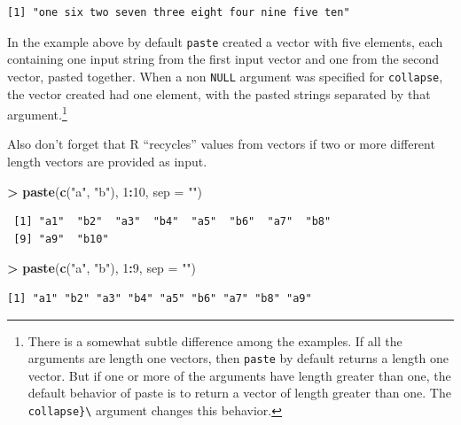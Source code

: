 \documentclass[]{krantz}
\makeatletter
\newenvironment{Shaded}{\begin{snugshade}}{\end{snugshade}}
\newcommand{\DataTypeTok}[1]{\textcolor[rgb]{0.27,0.27,0.27}{#1}}
\newcommand{\DecValTok}[1]{\textcolor[rgb]{0.06,0.06,0.06}{#1}}
\newcommand{\KeywordTok}[1]{\textcolor[rgb]{0.27,0.27,0.27}{\textbf{#1}}}
\newcommand{\NormalTok}[1]{#1}
\newcommand{\OperatorTok}[1]{\textcolor[rgb]{0.43,0.43,0.43}{\textbf{#1}}}
\newcommand{\StringTok}[1]{\textcolor[rgb]{0.5,0.5,0.5}{#1}}
\newenvironment{kframe}{%
\medskip{}
\setlength{\fboxsep}{.8em}
 \def\at@end@of@kframe{}%
 \ifinner\ifhmode%
  \def\at@end@of@kframe{\end{minipage}}%
  \begin{minipage}{\columnwidth}%
 \fi\fi%
 \def\FrameCommand##1{\hskip\@totalleftmargin \hskip-\fboxsep
 \colorbox{shadecolor}{##1}\hskip-\fboxsep
     \hskip-\linewidth \hskip-\@totalleftmargin \hskip\columnwidth}%
 \MakeFramed {\advance\hsize-\width
   \@totalleftmargin\z@ \linewidth\hsize
   \@setminipage}}%
 {\par\unskip\endMakeFramed%
 \at@end@of@kframe}
\renewenvironment{Shaded}{\begin{kframe}}{\end{kframe}}
\makeatother
\begin{document}
\begin{verbatim}
[1] "one six two seven three eight four nine five ten"
\end{verbatim}

In the example above by default \texttt{paste} created a vector with five elements, each containing one input string from the first input vector and one from the second vector, pasted together. When a non \texttt{NULL} argument was specified for \texttt{collapse}, the vector created had one element, with the pasted strings separated by that argument.\footnote{There is a somewhat subtle difference among the examples. If all the arguments are length one vectors, then \texttt{paste} by default returns a length one vector. But if one or more of the arguments have length greater than one, the default behavior of paste is to return a vector of length greater than one. The \texttt{collapse\}\textbackslash{}} argument changes this behavior.}

Also don't forget that R ``recycles'' values from vectors if two or more different length vectors are provided as input.

\begin{Shaded}
\begin{Highlighting}[]
\OperatorTok{>}\StringTok{ }\KeywordTok{paste}\NormalTok{(}\KeywordTok{c}\NormalTok{(}\StringTok{"a"}\NormalTok{, }\StringTok{"b"}\NormalTok{), }\DecValTok{1}\OperatorTok{:}\DecValTok{10}\NormalTok{, }\DataTypeTok{sep =} \StringTok{""}\NormalTok{)}
\end{Highlighting}
\end{Shaded}

\begin{verbatim}
 [1] "a1"  "b2"  "a3"  "b4"  "a5"  "b6"  "a7"  "b8" 
 [9] "a9"  "b10"
\end{verbatim}

\begin{Shaded}
\begin{Highlighting}[]
\OperatorTok{>}\StringTok{ }\KeywordTok{paste}\NormalTok{(}\KeywordTok{c}\NormalTok{(}\StringTok{"a"}\NormalTok{, }\StringTok{"b"}\NormalTok{), }\DecValTok{1}\OperatorTok{:}\DecValTok{9}\NormalTok{, }\DataTypeTok{sep =} \StringTok{""}\NormalTok{)}
\end{Highlighting}
\end{Shaded}

\begin{verbatim}
[1] "a1" "b2" "a3" "b4" "a5" "b6" "a7" "b8" "a9"
\end{verbatim}
\end{document}
